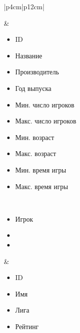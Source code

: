 \begin{table}[h!]
\begin{center}
\begin{threeparttable}
\begin{tabular}{|p{4cm}|p{12cm}|}
\begin{minipage}[t]{\linewidth}
            \end{minipage}
          & \begin{minipage}[t]{\linewidth}
              \begin{multicols}{2}
                \begin{itemize}[leftmargin=0mm,labelsep=0mm,nosep,after=\strut]
                  \item[] ID
                  \item[] Название
                  \item[] Производитель
                  \item[] Год выпуска
                  \item[] Мин. число игроков
                  \item[] Макс. число игроков
                  \item[] Мин. возраст
                  \item[] Макс. возраст
                  \item[] Мин. время игры
                  \item[] Макс. время игры
                \end{itemize}
              \end{multicols}
            \end{minipage}\\
            \hline
            \begin{minipage}[t]{\linewidth}
              \begin{multicols}{1}
                \begin{itemize}[leftmargin=0mm,labelsep=0mm,nosep,after=\strut]
                  \item[] Игрок
                  \item[]
                  \item[]
                \end{itemize}
              \end{multicols}
            \end{minipage}
          & \begin{minipage}[t]{\linewidth}
              \begin{multicols}{2}
                \begin{itemize}[leftmargin=0mm,labelsep=0mm,nosep,after=\strut]
                  \item[] ID
                  \item[] Имя
                  \item[] Лига
                  \item[] Рейтинг

\end{itemize}
\end{multicols}
\end{minipage}
\end{tabular}
\end{threeparttable}
\end{center}
\end{table}
